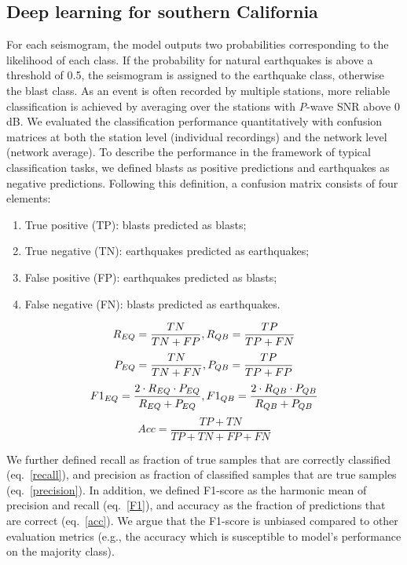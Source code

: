 \documentclass{gji}
\begin{document}
\subsection{Deep learning for southern California}
For each seismogram, the model outputs two probabilities corresponding to the likelihood of each class. If the probability for natural earthquakes is above a threshold of 0.5, the seismogram is assigned to the earthquake class, otherwise the blast class. As an event is often recorded by multiple stations, more reliable classification is achieved by averaging over the stations with \textit{P}-wave SNR above 0 dB. We evaluated the classification performance quantitatively with confusion matrices at both the station level (individual recordings) and the network level (network average). To describe the performance in the framework of typical classification tasks, we defined blasts as positive predictions and earthquakes as negative predictions. Following this definition, a confusion matrix consists of four elements:
\begin{enumerate}
\renewcommand{\theenumi}{(\arabic{enumi})}
\item True positive (TP): blasts predicted as blasts;
\item True negative (TN): earthquakes predicted as earthquakes;
\item False positive (FP): earthquakes predicted as blasts;
\item False negative (FN): blasts predicted as earthquakes.
\end{enumerate}

\begin{equation}
\label{recall}
R_{EQ}=\frac{TN}{TN+FP},\\R_{QB}=\frac{TP}{TP+FN}
\end{equation}
\begin{equation}
\label{precision}
P_{EQ}=\frac{TN}{TN+FN},\\P_{QB}=\frac{TP}{TP+FP}
\end{equation}
\begin{equation}
\label{F1}
F1_{EQ}=\frac{2 \cdot R_{EQ} \cdot P_{EQ}}{R_{EQ}+P_{EQ}},\\F1_{QB}=\frac{2 \cdot R_{QB} \cdot P_{QB}}{R_{QB}+P_{QB}}
\end{equation}
\begin{equation}
\label{acc}
Acc=\frac{TP+TN}{TP+TN+FP+FN}
\end{equation}

We further defined recall as fraction of true samples that are correctly classified (eq.~\ref{recall}), and precision as fraction of classified samples that are true samples (eq.~\ref{precision}). In addition, we defined F1-score as the harmonic mean of precision and recall (eq.~\ref{F1}), and accuracy as the fraction of predictions that are correct (eq.~\ref{acc}). We argue that the F1-score is unbiased compared to other evaluation metrics (e.g., the accuracy which is susceptible to model's performance on the majority class).
\end{document}
